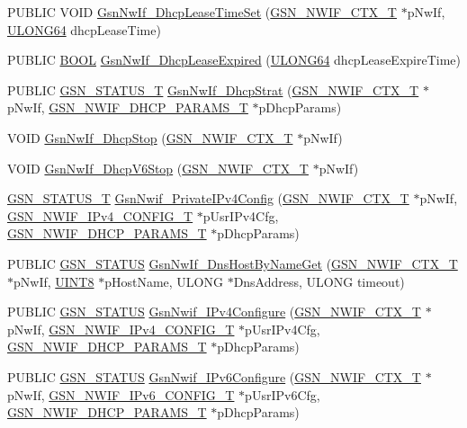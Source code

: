 \begin{DoxyCompactItemize}
PUBLIC VOID \hyperlink{a00534_abd774857f87aa3940257a3298b1299ef}{GsnNwIf\_\-DhcpLeaseTimeSet} (\hyperlink{a00167}{GSN\_\-NWIF\_\-CTX\_\-T} $\ast$pNwIf, \hyperlink{a00660_ga28961430434ccabca6862ea93fe9a15b}{ULONG64} dhcpLeaseTime)
\item 
PUBLIC \hyperlink{a00660_ga1f04022c0a182c51c059438790ea138c}{BOOL} \hyperlink{a00534_aeef793a2c3da25917feb130dad880a82}{GsnNwIf\_\-DhcpLeaseExpired} (\hyperlink{a00660_ga28961430434ccabca6862ea93fe9a15b}{ULONG64} dhcpLeaseExpireTime)
\item 
PUBLIC \hyperlink{a00659_gae36517c0f5872426a7034c9551eb96ac}{GSN\_\-STATUS\_\-T} \hyperlink{a00534_ae401c2332b64b7d4da14329fab309d8c}{GsnNwIf\_\-DhcpStrat} (\hyperlink{a00167}{GSN\_\-NWIF\_\-CTX\_\-T} $\ast$pNwIf, \hyperlink{a00168}{GSN\_\-NWIF\_\-DHCP\_\-PARAMS\_\-T} $\ast$pDhcpParams)
\item 
VOID \hyperlink{a00534_ad426afd4a106b468b2ba41a59de8bacd}{GsnNwIf\_\-DhcpStop} (\hyperlink{a00167}{GSN\_\-NWIF\_\-CTX\_\-T} $\ast$pNwIf)
\item 
VOID \hyperlink{a00534_aeb71dfef7a354215b3847a72ba6cee87}{GsnNwIf\_\-DhcpV6Stop} (\hyperlink{a00167}{GSN\_\-NWIF\_\-CTX\_\-T} $\ast$pNwIf)
\item 
\hyperlink{a00659_gae36517c0f5872426a7034c9551eb96ac}{GSN\_\-STATUS\_\-T} \hyperlink{a00534_a61054abc511da789e3d8d6ad340010e5}{GsnNwif\_\-PrivateIPv4Config} (\hyperlink{a00167}{GSN\_\-NWIF\_\-CTX\_\-T} $\ast$pNwIf, \hyperlink{a00170}{GSN\_\-NWIF\_\-IPv4\_\-CONFIG\_\-T} $\ast$pUsrIPv4Cfg, \hyperlink{a00168}{GSN\_\-NWIF\_\-DHCP\_\-PARAMS\_\-T} $\ast$pDhcpParams)
\item 
PUBLIC \hyperlink{a00660_gada5951904ac6110b1fa95e51a9ddc217}{GSN\_\-STATUS} \hyperlink{a00534_a67f0c19960ee130c6a6c37e035b0b2f5}{GsnNwIf\_\-DnsHostByNameGet} (\hyperlink{a00167}{GSN\_\-NWIF\_\-CTX\_\-T} $\ast$pNwIf, \hyperlink{a00660_gab27e9918b538ce9d8ca692479b375b6a}{UINT8} $\ast$pHostName, ULONG $\ast$DnsAddress, ULONG timeout)
\item 
PUBLIC \hyperlink{a00660_gada5951904ac6110b1fa95e51a9ddc217}{GSN\_\-STATUS} \hyperlink{a00534_a277d2776e17397bbba0ee76d8470bc00}{GsnNwif\_\-IPv4Configure} (\hyperlink{a00167}{GSN\_\-NWIF\_\-CTX\_\-T} $\ast$pNwIf, \hyperlink{a00170}{GSN\_\-NWIF\_\-IPv4\_\-CONFIG\_\-T} $\ast$pUsrIPv4Cfg, \hyperlink{a00168}{GSN\_\-NWIF\_\-DHCP\_\-PARAMS\_\-T} $\ast$pDhcpParams)
\item 
PUBLIC \hyperlink{a00660_gada5951904ac6110b1fa95e51a9ddc217}{GSN\_\-STATUS} \hyperlink{a00534_acf4ee707388061162dad65b686a6174b}{GsnNwif\_\-IPv6Configure} (\hyperlink{a00167}{GSN\_\-NWIF\_\-CTX\_\-T} $\ast$pNwIf, \hyperlink{a00171}{GSN\_\-NWIF\_\-IPv6\_\-CONFIG\_\-T} $\ast$pUsrIPv6Cfg, \hyperlink{a00168}{GSN\_\-NWIF\_\-DHCP\_\-PARAMS\_\-T} $\ast$pDhcpParams)

\end{DoxyCompactItemize}
